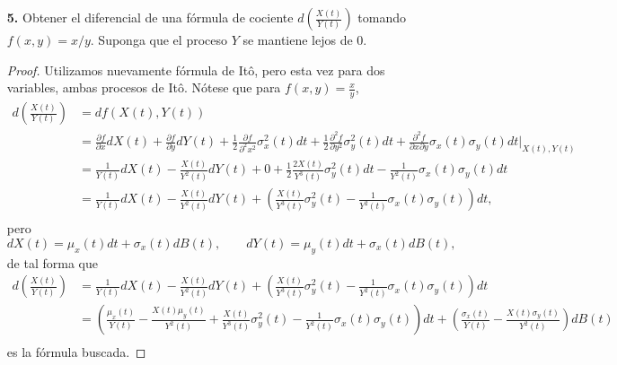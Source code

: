 \documentclass[letterpaper]{article}
\newcommand{\1}{\mathds{1}}
\theoremstyle{definition}
\theoremstyle{definition}
\theoremstyle{definition}
\theoremstyle{definition}
\theoremstyle{definition}
\begin{document}
\begin{enumerate}
    \item[\textbf{5.}] Obtener el diferencial de una fórmula de cociente $d \left(\frac{X(t)}{Y(t)}\right)$ 
    tomando $f(x,y)=x/y$. Suponga que el proceso $Y$ se mantiene lejos de 0.
    \begin{proof} 
      Utilizamos nuevamente fórmula de Itô, pero esta vez para dos variables, ambas procesos de Itô. Nótese que para $f(x,y)=\frac{x}{y}$,
      \begin{align*}
        d \left(\frac{X(t)}{Y(t)}\right)&=df(X(t),Y(t))\\
        &=\frac{\partial f}{\partial x}dX(t)+\frac{\partial f}{\partial y}dY(t)+\frac{1}{2}\frac{\partial f}{\partial^2 x^2}\sigma^2_x(t)dt+\frac{1}{2}\frac{\partial^2 f}{\partial y^2}\sigma^2_y(t)dt+\frac{\partial^2 f}{\partial x\partial y}\sigma_x(t)\sigma_y(t)dt\Big|_{X(t),Y(t)}\\
        &=\frac{1}{Y(t)}dX(t)-\frac{X(t)}{Y^2(t)}dY(t)+0+\frac{1}{2}\frac{2X(t)}{Y^3(t)}\sigma^2_y(t)dt-\frac{1}{Y^2(t)}\sigma_x(t)\sigma_y(t)dt\\
        &=\frac{1}{Y(t)}dX(t)-\frac{X(t)}{Y^2(t)}dY(t)+\left(\frac{X(t)}{Y^3(t)}\sigma^2_y(t)-\frac{1}{Y^2(t)}\sigma_x(t)\sigma_y(t)\right)dt,\\
      \end{align*} 
      pero
      \[
        dX(t)=\mu_x(t)dt+\sigma_x(t)dB(t), \qquad   dY(t)=\mu_y(t)dt+\sigma_x(t)dB(t),
      \]
      de tal forma que 
      \begin{align*}
        d \left(\frac{X(t)}{Y(t)}\right)&=\frac{1}{Y(t)}dX(t)-\frac{X(t)}{Y^2(t)}dY(t)+\left(\frac{X(t)}{Y^3(t)}\sigma^2_y(t)-\frac{1}{Y^2(t)}\sigma_x(t)\sigma_y(t)\right)dt\\
        &=\left(\frac{\mu_x(t)}{Y(t)}-\frac{X(t)\mu_y(t)}{Y^2(t)}+\frac{X(t)}{Y^3(t)}\sigma^2_y(t)-\frac{1}{Y^2(t)}\sigma_x(t)\sigma_y(t)\right)dt+\left(\frac{\sigma_x(t)}{Y(t)}-\frac{X(t)\sigma_y(t)}{Y^2(t)}\right)dB(t)\\
      \end{align*}
      es la fórmula buscada.
     \end{proof}
\end{enumerate}
\end{document}
